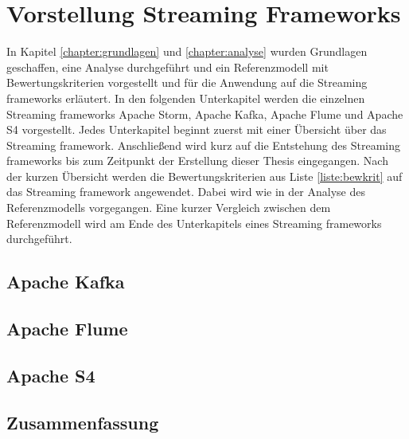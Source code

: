 \chapter{Vorstellung Streaming Frameworks}
\label{chapter:vorstellung}

In Kapitel \ref{chapter:grundlagen} und \ref{chapter:analyse} wurden Grundlagen geschaffen, eine Analyse durchgeführt und ein Referenzmodell mit Bewertungskriterien vorgestellt und für die Anwendung auf die Streaming frameworks erläutert. In den folgenden Unterkapitel werden die einzelnen Streaming frameworks Apache Storm, Apache Kafka, Apache Flume und Apache S4 vorgestellt. Jedes Unterkapitel beginnt zuerst mit einer Übersicht über das Streaming framework. Anschließend wird kurz auf die Entstehung des Streaming frameworks bis zum Zeitpunkt der Erstellung dieser Thesis eingegangen. Nach der kurzen Übersicht werden die Bewertungskriterien aus Liste \ref{liste:bewkrit} auf das Streaming framework angewendet. Dabei wird wie in der Analyse des Referenzmodells vorgegangen. Eine kurzer Vergleich zwischen dem Referenzmodell wird am Ende des Unterkapitels eines Streaming frameworks durchgeführt.



\section{Apache Kafka}
\section{Apache Flume}
\section{Apache S4}
\section{Zusammenfassung}